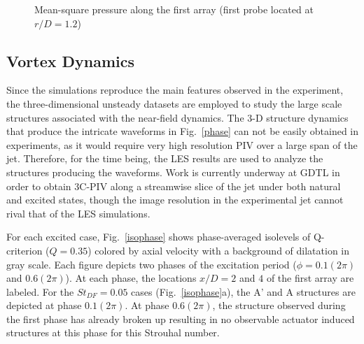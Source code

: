 \documentclass[english]{aiaa-tc}
\begin{document}
\begin{figure}
\centering{}
\caption{Mean-square pressure along the first array (first probe located at $r/D=1.2$)}\label{pms}
\end{figure}

\subsection{Vortex Dynamics}
Since the simulations reproduce the main features observed in the
experiment, the three-dimensional unsteady datasets are employed to
study the large scale structures associated with the near-field
dynamics. The 3-D 
structure dynamics that produce the intricate waveforms
in Fig.~\ref{phase} can not be easily obtained in experiments, as it would require very high resolution PIV over a large span of the jet.
Therefore, for the time being, the LES results are used to analyze the structures producing
the waveforms. Work is currently underway at GDTL in order to obtain 3C-PIV along a streamwise slice of the jet under both natural and excited states, though the image resolution in the experimental jet cannot rival that of the LES simulations.

For each excited case, Fig.~\ref{isophase} shows phase-averaged
isolevels of Q-criterion ($Q=0.35$) colored by axial velocity with a
background of dilatation in gray scale.  Each figure depicts two
phases of the excitation period ($\phi =0.1(2\pi)$ and $0.6(2\pi)$).
At each phase, the locations $x/D=2$ and $4$ of the first array are
labeled.  For the $St_{DF}=0.05$ cases (Fig.~\ref{isophase}a), the A'
and A structures are depicted at phase $0.1(2\pi)$. At phase
$0.6(2\pi)$, the structure observed during the first phase has already
broken up 
resulting in no observable actuator induced structures at this phase
for this Strouhal number.
\end{document}
